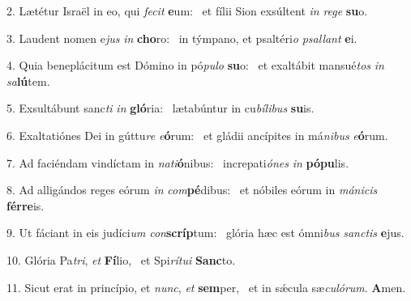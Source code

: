 2. Lætétur Israël in eo, qui \textit{fe}\textit{cit} \textbf{e}um: \ast\  et fílii Sion exsúltent \textit{in} \textit{re}\textit{ge} \textbf{su}o.\

3. Laudent nomen e\textit{jus} \textit{in} \textbf{cho}ro: \ast\  in týmpano, et psaltéri\textit{o} \textit{psal}\textit{lant} \textbf{e}i.\

4. Quia beneplácitum est Dómino in pó\textit{pu}\textit{lo} \textbf{su}o: \ast\  et exaltábit mansué\textit{tos} \textit{in} \textit{sa}\textbf{lú}tem.\

5. Exsultábunt sanc\textit{ti} \textit{in} \textbf{gló}ria: \ast\  lætabúntur in cu\textit{bí}\textit{li}\textit{bus} \textbf{su}is.\

6. Exaltatiónes Dei in gúttu\textit{re} \textit{e}\textbf{ó}rum: \ast\  et gládii ancípites in má\textit{ni}\textit{bus} \textit{e}\textbf{ó}rum.\

7. Ad faciéndam vindíctam in \textit{na}\textit{ti}\textbf{ó}nibus: \ast\  increpati\textit{ó}\textit{nes} \textit{in} \textbf{pó}\textbf{pu}lis.\

8. Ad alligándos reges eórum \textit{in} \textit{com}\textbf{pé}dibus: \ast\  et nóbiles eórum in \textit{má}\textit{ni}\textit{cis} \textbf{fér}\textbf{re}is.\

9. Ut fáciant in eis judíci\textit{um} \textit{con}\textbf{scríp}tum: \ast\  glória hæc est ómni\textit{bus} \textit{sanc}\textit{tis} \textbf{e}jus.\

10. Glória Pa\textit{tri}, \textit{et} \textbf{Fí}lio, \ast\  et Spi\textit{rí}\textit{tu}\textit{i} \textbf{Sanc}to.\

11. Sicut erat in princípio, et \textit{nunc}, \textit{et} \textbf{sem}per, \ast\  et in sǽcula sæ\textit{cu}\textit{ló}\textit{rum}. \textbf{A}men.\

